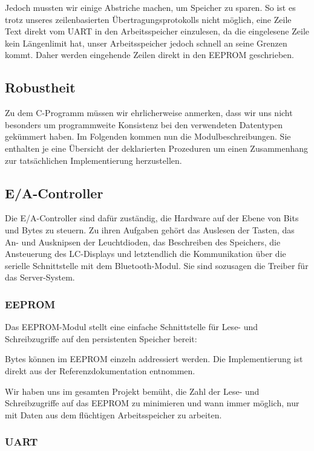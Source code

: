 \documentclass[ngerman]{article}
\begin{document}
Jedoch mussten wir einige Abstriche machen, um Speicher zu sparen. So ist
es trotz unseres zeilenbasierten Übertragungsprotokolls nicht möglich, eine
Zeile Text direkt vom UART in den Arbeitsspeicher einzulesen, da die
eingelesene Zeile kein Längenlimit hat, unser Arbeitsspeicher jedoch schnell
an seine Grenzen kommt. Daher werden eingehende Zeilen direkt in den EEPROM
geschrieben.

\subsection{Robustheit}

Zu dem C-Programm müssen wir ehrlicherweise anmerken, dass wir uns nicht
besonders um programmweite Konsistenz bei den verwendeten Datentypen
ge\-kümmert haben. Im Folgenden kommen nun die Modulbeschreibungen. Sie
enthalten je eine Übersicht der deklarierten Prozeduren um einen Zusammenhang
zur tatsächlichen Implementierung herzustellen.


\subsection{E/A-Controller}

Die E/A-Controller sind dafür zuständig, die Hardware auf der Ebene von Bits
und Bytes zu steuern. Zu ihren Aufgaben gehört das Auslesen der Tasten, das An-
und Ausknipsen der Leuchtdioden,  das Beschreiben des Speichers, die
Ansteuerung des LC-Displays und letztendlich die Kommunikation über die
serielle Schnittstelle mit dem Bluetooth-Modul. Sie sind sozusagen die Treiber
für das Server-System.

\subsubsection{EEPROM}

Das EEPROM-Modul stellt eine einfache Schnittstelle für Lese- und
Schreibzugriffe auf den persistenten Speicher bereit:
 


Bytes können im EEPROM einzeln addressiert werden. Die Implementierung ist
direkt aus der Referenzdokumentation entnommen.

Wir haben uns im gesamten Projekt bemüht, die Zahl der Lese- und
Schreibzugriffe auf das EEPROM zu minimieren und wann immer möglich, nur mit
Daten aus dem flüchtigen Arbeitsspeicher zu arbeiten.

\subsubsection{UART}
\end{document}

